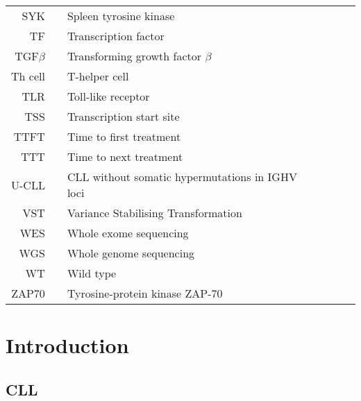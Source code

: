 \documentclass[11pt, a4paper, twosided]{book}
\begin{document}
\begin{tabular}{rp{0.2cm}lp{1cm}rp{0.2cm}l}

  SYK & & Spleen tyrosine kinase \\
    TF & & Transcription factor \\
    TGF$\beta$ & & Transforming growth factor $\beta$ \\
    Th cell & & T-helper cell \\
    TLR & & Toll-like receptor \\ 
    TSS & & Transcription start site \\
    TTFT & & Time to first treatment \\
    TTT & & Time to next treatment \\
    U-CLL & & CLL without somatic hypermutations in IGHV loci \\
    VST & & Variance Stabilising Transformation \\
    WES & & Whole exome sequencing \\
    WGS & & Whole genome sequencing \\
    WT & & Wild type \\
    ZAP70 & & Tyrosine-protein kinase ZAP-70 \\

    
   
\end{tabular}
%
%
\newpage
\pagestyle{plain} %
\setcounter{page}{1}    %

\hypertarget{introduction}{%
\chapter{Introduction}\label{introduction}}

\hypertarget{cll}{%
\section{CLL}\label{cll}}
\end{document}
